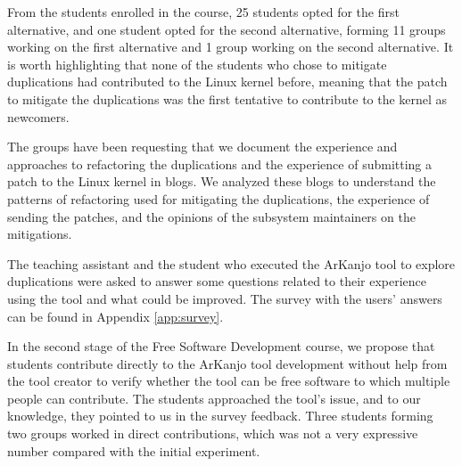 From the students enrolled in the course, 25 students opted for the first alternative, and one 
student opted for the second alternative, forming 11 groups working on the first alternative 
and 1 group working on the second alternative. It is worth highlighting that none of the students 
who chose to mitigate duplications had contributed to the Linux kernel before, meaning that the 
patch to mitigate the duplications was the first tentative to contribute to the kernel as newcomers.

The groups have been requesting that we document the experience and approaches to refactoring the 
duplications and the experience of submitting a patch to the Linux kernel in blogs. We analyzed 
these blogs to understand the patterns of refactoring used for mitigating the duplications, the 
experience of sending the patches, and the opinions of the subsystem maintainers on the mitigations.

The teaching assistant and the student who executed the ArKanjo tool to explore duplications were 
asked to answer some questions related to their experience using the tool and what could be improved. 
The survey with the users' answers can be found in Appendix \ref{app:survey}.

In the second stage of the Free Software Development course, we propose that students contribute 
directly to the ArKanjo tool development without help from the tool creator to verify whether the 
tool can be free software to which multiple people can contribute. The students approached the tool’s 
issue, and to our knowledge, they pointed to us in the survey feedback. Three students forming two 
groups worked in direct contributions, which was not a very expressive number compared with the 
initial experiment.
